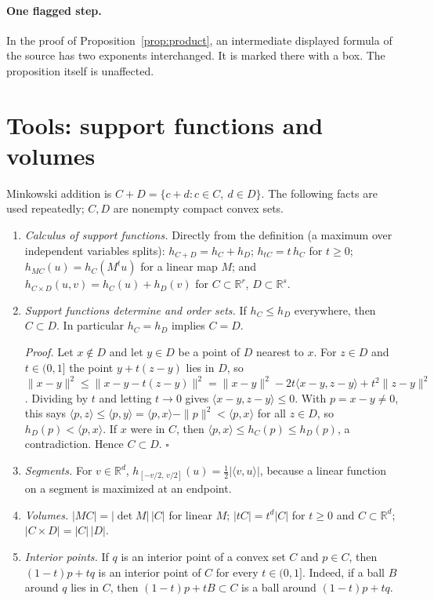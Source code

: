 \documentclass[11pt]{article}
\newcommand{\R}{\mathbb R}
\begin{document}
\paragraph{One flagged step.}
In the proof of Proposition~\ref{prop:product}, an intermediate displayed
formula of the source has two exponents interchanged. It is marked there
with a box. The proposition itself is unaffected.

\section{Tools: support functions and volumes}\label{sec:tools}

Minkowski addition is \(C+D=\{c+d:c\in C,\ d\in D\}\). The following facts
are used repeatedly; \(C,D\) are nonempty compact convex sets.

\begin{enumerate}[label=\textbf{(S\arabic*)},leftmargin=3em,itemsep=3pt]
\item \emph{Calculus of support functions.} Directly from the definition
(a maximum over independent variables splits):
\(h_{C+D}=h_C+h_D\); \(h_{tC}=t\,h_C\) for \(t\ge0\);
\(h_{MC}(u)=h_C(M^tu)\) for a linear map \(M\); and
\(h_{C\times D}(u,v)=h_C(u)+h_D(v)\) for \(C\subset\R^r\),
\(D\subset\R^s\).
\item \emph{Support functions determine and order sets.} If
\(h_C\le h_D\) everywhere, then \(C\subset D\). In particular
\(h_C=h_D\) implies \(C=D\).

\emph{Proof.} Let \(x\notin D\) and let \(y\in D\) be a point of \(D\)
nearest to \(x\). For \(z\in D\) and \(t\in(0,1]\) the point
\(y+t(z-y)\) lies in \(D\), so
\(\|x-y\|^2\le\|x-y-t(z-y)\|^2
=\|x-y\|^2-2t\langle x-y,z-y\rangle+t^2\|z-y\|^2\).
Dividing by \(t\) and letting \(t\to0\) gives
\(\langle x-y,z-y\rangle\le0\). With \(p=x-y\neq0\), this says
\(\langle p,z\rangle\le\langle p,y\rangle
=\langle p,x\rangle-\|p\|^2<\langle p,x\rangle\) for all \(z\in D\), so
\(h_D(p)<\langle p,x\rangle\). If \(x\) were in \(C\), then
\(\langle p,x\rangle\le h_C(p)\le h_D(p)\), a contradiction. Hence
\(C\subset D\). \(\square\)
\item \emph{Segments.} For \(v\in\R^d\),
\(h_{[-v/2,\,v/2]}(u)=\tfrac12|\langle v,u\rangle|\), because a linear
function on a segment is maximized at an endpoint.
\item \emph{Volumes.} \(|MC|=|\det M|\,|C|\) for linear \(M\);
\(|tC|=t^d|C|\) for \(t\ge0\) and \(C\subset\R^d\);
\(|C\times D|=|C|\,|D|\).
\item \emph{Interior points.} If \(q\) is an interior point of a convex
set \(C\) and \(p\in C\), then \((1-t)p+tq\) is an interior point of \(C\)
for every \(t\in(0,1]\). Indeed, if a ball \(B\) around \(q\) lies in
\(C\), then \((1-t)p+tB\subset C\) is a ball around \((1-t)p+tq\).
\end{enumerate}
\end{document}
